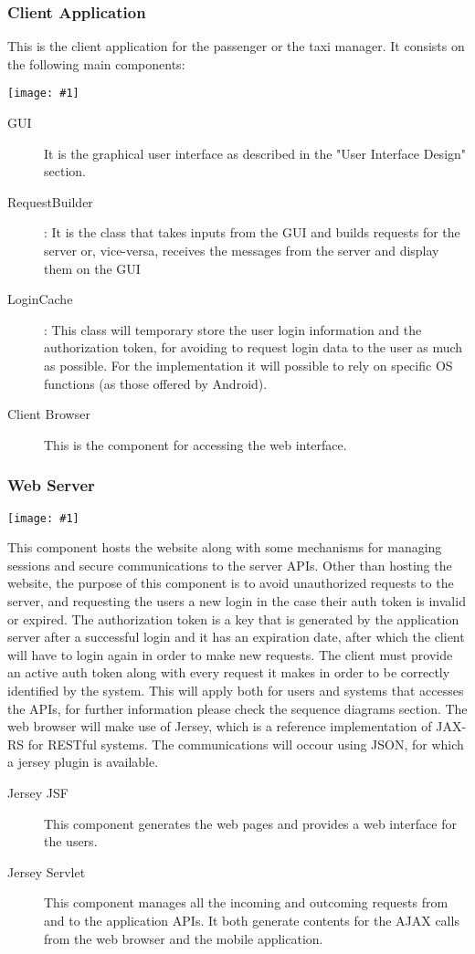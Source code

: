 \documentclass[11pt, a4paper,titlepage]{article}
\newcommand{\image}[1]{
	\begin{center}
		\noindent \texttt{[image: \#1]}
	\end{center}
	}
\begin{document}
 \subsubsection{Client Application}
	 This is the client application for the passenger or the taxi manager. It consists on the following main components:
	 \image{diagram_class_client.png}
	 \begin{description}
	 	\item[GUI] It is the graphical user interface as described in the "User Interface Design" section.
	 	\item[RequestBuilder]: It is the class that takes inputs from the GUI and builds requests for the server or, vice-versa, receives the messages from the server and display them on the GUI
	 	\item[LoginCache]: This class will temporary store the user login information and the authorization token, for avoiding to request login data to the user as much as possible. For the implementation it will possible to rely on specific OS functions (as those offered by Android).
		\item[Client Browser] This is the component for accessing the web interface.
	 \end{description}
	\newpage
 \subsubsection{Web Server}
	 \image{diagram_class_webserver.png}
	 This component hosts the website along with some mechanisms for managing sessions and secure communications to the server APIs. Other than hosting the website, the purpose of this component is to avoid unauthorized requests to the server, and requesting the users a new login in the case their auth token is invalid or expired.\newline
	 The authorization token is a key that is generated by the application server after a successful login and it has an expiration date, after which the client will have to login again in order to make new requests.
	 The client must provide an active auth token along with every request it makes in order to be correctly identified by the system.
	  This will apply both for users and systems that accesses the APIs, for further information please check the sequence diagrams section. 
	  The web browser will make use of Jersey, which is a reference implementation of JAX-RS for RESTful systems. The communications will occour using JSON, for which a jersey plugin is available.
	 \begin{description}
	 	\item[Jersey JSF] This component generates the web pages and provides a web interface for the users.
	 	\item[Jersey Servlet]  This component manages all the incoming and outcoming requests from and to the application APIs. It both generate contents for the AJAX calls from the web browser and the mobile application.
	 \end{description}
	 \newpage
\end{document}
